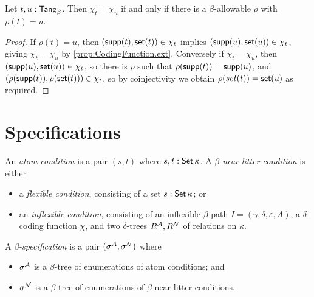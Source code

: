 \begin{proposition}
  Let \( t, u : \mathsf{Tang}_\beta \).
  Then \( \chi_t = \chi_u \) if and only if there is a \( \beta \)-allowable \( \rho \) with \( \rho(t) = u \).
\end{proposition}
\begin{proof}
  If \( \rho(t) = u \), then \( (\operatorname{\mathsf{supp}}(t), \operatorname{\mathsf{set}}(t)) \in \chi_t \) implies \( (\operatorname{\mathsf{supp}}(u), \operatorname{\mathsf{set}}(u)) \in \chi_t \), giving \( \chi_t = \chi_u \) by \cref{prop:CodingFunction.ext}.
  Conversely if \( \chi_t = \chi_u \), then \( (\operatorname{\mathsf{supp}}(u), \operatorname{\mathsf{set}}(u)) \in \chi_t \), so there is \( \rho \) such that \( \rho(\operatorname{\mathsf{supp}}(t)) = \operatorname{\mathsf{supp}}(u) \), and \( (\rho(\operatorname{\mathsf{supp}}(t)), \rho(\operatorname{\mathsf{set}}(t))) \in \chi_t \), so by coinjectivity we obtain \( \rho(set(t)) = \operatorname{\mathsf{set}}(u) \) as required.
\end{proof}

\section{Specifications}
\begin{definition}
  An \emph{atom condition} is a pair \( (s, t) \) where \( s, t : \operatorname{\mathsf{Set}} \kappa \).
  A \emph{\( \beta \)-near-litter condition} is either
  \begin{itemize}
    \item a \emph{flexible condition}, consisting of a set \( s : \operatorname{\mathsf{Set}} \kappa \); or
    \item an \emph{inflexible condition}, consisting of an inflexible \( \beta \)-path \( I = (\gamma,\delta,\varepsilon,A) \), a \( \delta \)-coding function \( \chi \), and two \( \delta \)-trees \( R^{\mathcal A}, R^{\mathcal N} \) of relations on \( \kappa \).
  \end{itemize}
  A \emph{\( \beta \)-specification} is a pair \( (\sigma^{\mathcal A}, \sigma^{\mathcal N}) \) where
  \begin{itemize}
    \item \( \sigma^{\mathcal A} \) is a \( \beta \)-tree of enumerations of atom conditions; and
    \item \( \sigma^{\mathcal N} \) is a \( \beta \)-tree of enumerations of \( \beta \)-near-litter conditions.
  \end{itemize}
\end{definition}
